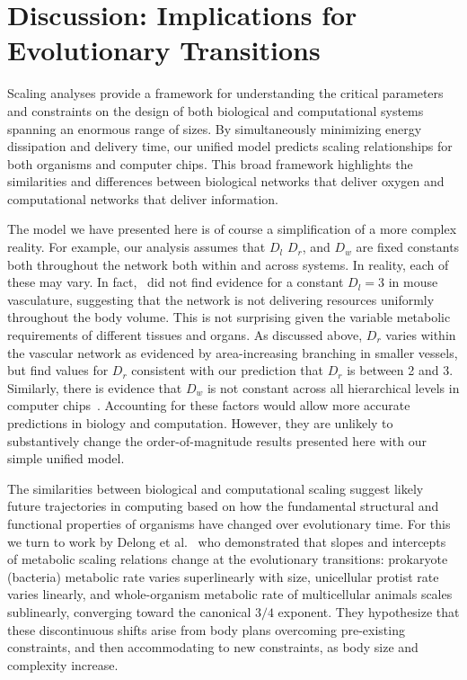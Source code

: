 \documentclass[12pt]{article}
\begin{document}
\section{Discussion: Implications for Evolutionary Transitions}
\label{sec:discussion}

Scaling analyses provide a framework for understanding the critical parameters and constraints on the design of both biological and computational systems spanning an
enormous range of sizes.  By simultaneously minimizing energy dissipation and delivery
time, our unified model 
predicts scaling relationships for both
organisms and computer chips.  This broad framework highlights the similarities
and differences between biological networks that deliver oxygen and
computational networks that deliver information. 

The model we have presented here is of course a simplification of a more complex reality. For example, our analysis assumes that $D_l$ $D_r$, and $D_w$ are fixed constants both throughout the network both within and across systems. In reality, each of these may vary. In fact,~\cite{newberry2015testing} did not find evidence for a constant $D_l = 3$ in mouse vasculature, suggesting that the network is not delivering resources uniformly throughout the body volume. This is not surprising given the variable metabolic requirements of different tissues and organs. As discussed above, $D_r$ varies within the vascular network as evidenced by area-increasing branching in smaller vessels, but \cite{newberry2015testing} find values for $D_r$ consistent with our prediction that $D_r$ is between 2 and 3. Similarly, there is evidence that $D_w$ is not constant across all hierarchical levels in computer chips~\cite{ozaktas2004information}. Accounting for these factors would allow more accurate predictions in biology and computation.  However, they are unlikely to substantively change the order-of-magnitude results presented here with our simple unified model. 

The similarities between biological and computational scaling
suggest likely future trajectories in computing based on how the fundamental structural and functional properties of organisms have changed over evolutionary time. For this we turn to work by Delong et al.~\cite{delong2010shifts} who
demonstrated that slopes and intercepts of metabolic scaling relations change at the
evolutionary transitions: prokaryote (bacteria) metabolic rate varies superlinearly with
size, unicellular protist rate varies linearly, and whole-organism metabolic rate of multicellular animals scales sublinearly, converging toward the canonical $3/4$ exponent. They
hypothesize that these discontinuous shifts arise from body plans overcoming pre-existing
constraints, and then accommodating to new constraints, as body size and complexity increase.
\end{document}
